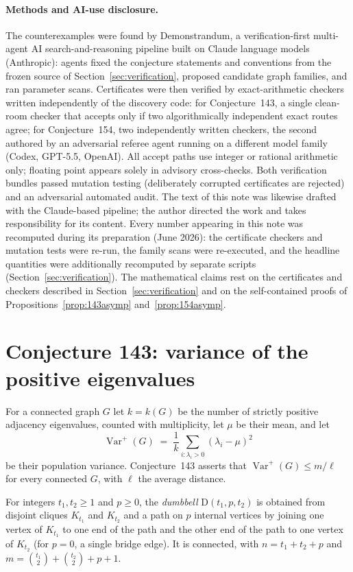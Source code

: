 \documentclass[11pt]{article}
\theoremstyle{remark}
\newcommand{\Varp}{\operatorname{Var}^{+}}
\newcommand{\D}{\mathrm{D}}
\begin{document}
\paragraph{Methods and AI-use disclosure.}
The counterexamples were found by Demonstrandum, a verification-first
multi-agent AI search-and-reasoning pipeline built on Claude language
models (Anthropic): agents fixed the
conjecture statements and conventions from the frozen source of
Section~\ref{sec:verification}, proposed candidate graph families, and ran
parameter scans. Certificates were then verified by exact-arithmetic
checkers written independently of the discovery code: for Conjecture~143, a
single clean-room checker that accepts only if two algorithmically
independent exact routes agree; for Conjecture~154, two independently
written checkers, the second authored by an adversarial referee agent
running on a different model family (Codex, GPT-5.5, OpenAI). All
accept paths use integer or rational arithmetic only; floating point appears
solely in advisory cross-checks. Both verification bundles passed mutation
testing (deliberately corrupted certificates are rejected) and an adversarial
automated audit. The text of this note was likewise drafted with the
Claude-based pipeline; the author directed the work and takes responsibility
for its content. Every number appearing in this note was recomputed during
its preparation (June 2026): the certificate checkers and mutation tests
were re-run, the family scans were re-executed, and the headline quantities
were additionally recomputed by separate scripts
(Section~\ref{sec:verification}). The mathematical claims rest on the
certificates and checkers
described in Section~\ref{sec:verification} and on the self-contained proofs
of Propositions~\ref{prop:143asymp} and~\ref{prop:154asymp}.

\section{Conjecture 143: variance of the positive eigenvalues}\label{sec:143}

For a connected graph $G$ let $k = k(G)$ be the number of strictly positive
adjacency eigenvalues, counted with multiplicity, let $\mu$ be their mean,
and let
\[
\Varp(G) \;=\; \frac1k \sum_{i\colon \lambda_i > 0} (\lambda_i - \mu)^2
\]
be their population variance. Conjecture~143 asserts that
$\Varp(G) \le m/\ell$ for every connected $G$, with $\ell$ the average
distance.

For integers $t_1, t_2 \ge 1$ and $p \ge 0$, the \emph{dumbbell}
$\D(t_1,p,t_2)$ is obtained from disjoint cliques $K_{t_1}$ and $K_{t_2}$ and
a path on $p$ internal vertices by joining one vertex of $K_{t_1}$ to one end
of the path and the other end of the path to one vertex of $K_{t_2}$ (for
$p=0$, a single bridge edge). It is connected, with
$n = t_1 + t_2 + p$ and $m = \binom{t_1}{2} + \binom{t_2}{2} + p + 1$.
\end{document}
